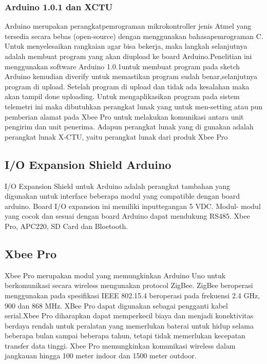 \subsubsection {Arduino 1.0.1 dan XCTU}

Arduino merupakan perangkatpemrograman mikrokontroller jenis Atmel yang tersedia secara bebas (open-source)
dengan menggunakan bahasapemrograman C. Untuk menyelesaikan rangkaian agar bisa bekerja, maka langkah selanjutnya adalah membuat program yang
akan diupload ke board Arduino.Penelitian ini menggunakan software Arduino 1.0.1untuk membuat program pada sketch Arduino kemudian diverify
untuk memastikan program sudah benar,selanjutnya program di upload. Setelah program di upload dan tidak ada kesalahan
maka akan tampil done uploading. Untuk mengaplikasikan program pada sistem telemetri ini maka dibutuhkan perangkat lunak yang untuk men-setting atau pun pemberian alamat pada Xbee Pro untuk melakukan komunikasi antara unit pengirim dan unit penerima. Adapun
perangkat lunak yang di gunakan adalah perangkat lunak X-CTU, yaitu perangkat lunak dari produk Xbee Pro

\subsection  {I/O Expansion Shield Arduino}
I/O Expansion Shield untuk Arduino adalah perangkat tambahan yang digunakan untuk interface beberapa modul yang compatible dengan board arduino. Board I/O expansion ini memiliki inputtegangan 5 VDC. Modul- modul yang cocok dan sesuai dengan board Arduino dapat mendukung RS485. Xbee Pro, APC220, SD Card dan Bloetooth.

\subsection {Xbee Pro}
Xbee Pro merupakan modul yang memungkinkan Arduino Uno untuk berkomunikasi secara wireless
mengunakan protocol ZigBee. ZigBee beroperasi menggunakan pada spesifikasi IEEE 802.15.4 beroperasi pada frekuensi
2.4 GHz, 900 dan 868 MHz. XBee Pro dapat digunakan sebagai pengganti kabel serial.Xbee Pro diharapkan dapat memperkecil biaya dan menjadi
konektivitas berdaya rendah untuk peralatan yang memerlukan baterai untuk hidup selama beberapa bulan sampai beberapa tahun, tetapi tidak memerlukan kecepatan transfer data tinggi. Xbee Pro memungkinkan komunikasi wireless dalam jangkauan hingga 100 meter indoor dan 1500 meter outdoor.

